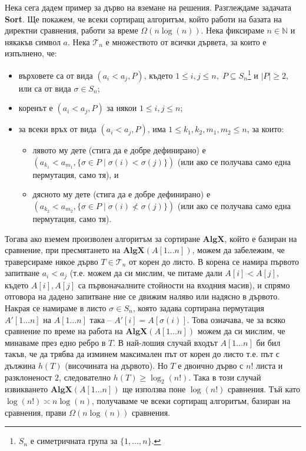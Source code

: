 \documentclass{article}
\newcommand{\N}{\mathbb{N}}
\newcommand{\calT}{\mathcal{T}}
\theoremstyle{definition}
\theoremstyle{plain}
\theoremstyle{remark}
\theoremstyle{definition}
\begin{document}
Нека сега дадем пример за дърво на вземане на решения.
Разглеждаме задачата \textbf{Sort}.
Ще покажем, че всеки сортиращ алгоритъм, който работи на базата на директни сравнения, работи за време $\Omega(n \log (n))$.
Нека фиксираме $n \in \N$ и някакъв символ $a$.
Нека $\calT_n$ е множеството от всички дървета, за които е изпълнено, че:
\begin{itemize}
    \item върховете са от вида $(a_i < a_j, P)$, където $1 \leq i, j \leq n, \; P \subseteq S_n$\footnote{$S_n$ е симетричната група за $\{ 1, \dots, n \}$.} и $|P| \geq 2$, или са от вида $\sigma \in S_n$;
    \item коренът е $(a_i < a_j, P)$ за някои $1 \leq i, j \leq n$;
    \item за всеки връх от вида $(a_i < a_j, P)$, има $1 \leq k_1, k_2, m_1, m_2 \leq n$, за които:
          \begin{itemize}
              \item лявото му дете (стига да е добре дефинирано) е $(a_{k_1} < a_{m_1}, \{ \sigma \in P \mid \sigma(i) < \sigma(j) \})$ (или ако се получава само една пермутация, само тя), и
              \item дясното му дете (стига да е добре дефинирано) е $(a_{k_2} < a_{m_2}, \{ \sigma \in P \mid \sigma(i) \not< \sigma(j) \})$ (или ако се получава само една пермутация, само тя).
          \end{itemize}
\end{itemize}
Тогава ако вземем произволен алгоритъм за сортиране $\mathbf{AlgX}$, който е базиран на сравнение, при пресмятането на $\mathbf{AlgX}(A[1 \dots n])$, можем да забележим, че траверсираме някое дърво $T \in \calT_n$ от корен до листо.
В корена се намира първото запитване $a_i < a_j$ (т.е. можем да си мислим, че питаме дали $A[i] < A[j]$, където $A[i], A[j]$ са първоначалните стойности на входния масив), и спрямо отговора на дадено запитване ние се движим наляво или надясно в дървото.
Накрая се намираме в листо $\sigma \in S_n$, която задава сортирана пермутация $A'[1 \dots n]$ на $A[1 \dots n]$ така -- $A'[i] = A[\sigma(i)]$.
Това означава, че за всяко сравнение по време на работа на $\mathbf{AlgX}(A[1 \dots n])$ можем да си мислим, че минаваме през едно ребро в $T$.
В най-лошия случай входът $A[1 \dots n]$ би бил такъв, че да трябва да изминем максимален път от корен до листо т.е. път с дължина $h(T)$ (височината на дървото).
Но $T$ е двоично дърво с $n!$ листа и разклоненост $2$, следователно $h(T) \geq \log_2(n!)$.
Така в този случай извикването $\mathbf{AlgX}(A[1 \dots n])$ ще използва поне $\log(n!)$ сравнения.
Тъй като $\log(n!) \asymp n \log(n)$, получаваме че всеки сортиращ алгоритъм, базиран на сравнения, прави $\Omega(n \log(n))$ сравнения.
\end{document}
